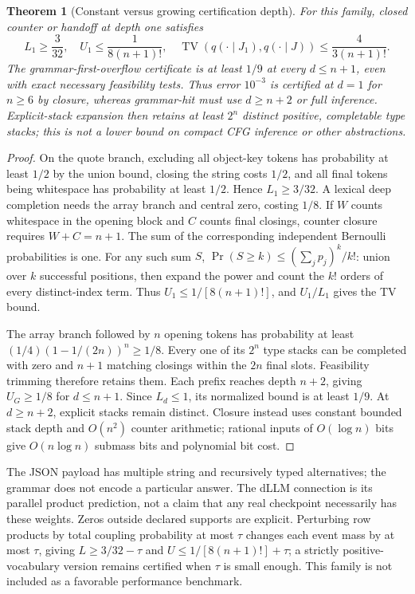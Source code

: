\documentclass[12pt]{article}
\theoremstyle{readable}
\newtheorem{theorem}{Theorem}
\begin{document}
\begin{theorem}[Constant versus growing certification depth]
For this family, closed counter or handoff at depth one satisfies
\begin{equation}
 L_1\ge\frac3{32},\quad U_1\le\frac1{8(n+1)!},\quad
 \operatorname{TV}(q(\cdot\mid J_1),q(\cdot\mid J))
       \le\frac4{3(n+1)!}.
 \label{eq:separation}
\end{equation}
The grammar-first-overflow certificate is at least $1/9$ at every $d\le n+1$,
even with exact necessary feasibility tests. Thus error $10^{-3}$ is certified
at $d=1$ for $n\ge6$ by closure, whereas grammar-hit must use $d\ge n+2$ or
full inference. Explicit-stack expansion then retains at least $2^n$ distinct
positive, completable type stacks; this is not a lower bound on compact CFG
inference or other abstractions.
\end{theorem}
\begin{proof}
On the quote branch, excluding all object-key tokens has probability at least
$1/2$ by the union bound, closing the string costs $1/2$, and all final tokens
being whitespace has probability at least $1/2$. Hence $L_1\ge3/32$.
A lexical deep completion needs the array branch and central zero, costing
$1/8$. If $W$ counts whitespace in the opening block and $C$ counts final
closings, counter closure requires $W+C=n+1$. The sum of the corresponding
independent Bernoulli probabilities is one. For any such sum $S$,
$\Pr(S\ge k)\le(\sum_jp_j)^k/k!$: union over $k$ successful positions, then
expand the power and count the $k!$ orders of every distinct-index term.
Thus $U_1\le1/[8(n+1)!]$, and $U_1/L_1$ gives the TV bound.

The array branch followed by $n$ opening tokens has probability at least
$(1/4)(1-1/(2n))^n\ge1/8$. Every one of its $2^n$ type stacks can be completed
with zero and $n+1$ matching closings within the $2n$ final slots. Feasibility
trimming therefore retains them. Each prefix reaches depth $n+2$, giving
$U_G\ge1/8$ for $d\le n+1$. Since $L_d\le1$, its normalized bound is at least
$1/9$. At $d\ge n+2$, explicit stacks remain distinct. Closure instead uses
constant bounded stack depth and $O(n^2)$ counter arithmetic; rational inputs
of $O(\log n)$ bits give $O(n\log n)$ submass bits and polynomial bit cost.
\end{proof}

The JSON payload has multiple string and recursively typed alternatives;
the grammar does not encode a particular answer. The dLLM connection is its
parallel product prediction, not a claim that any real checkpoint necessarily
has these weights. Zeros outside declared supports are explicit. Perturbing
row products by total coupling probability at most $\tau$ changes each event
mass by at most $\tau$, giving $L\ge3/32-\tau$ and
$U\le1/[8(n+1)!]+\tau$; a strictly positive-vocabulary version remains certified
when $\tau$ is small enough. This family is not included as a favorable
performance benchmark.
\end{document}
